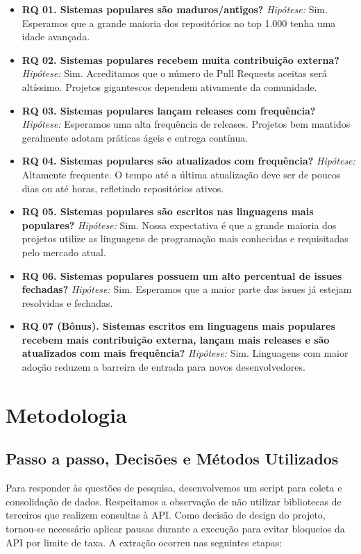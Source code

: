 \documentclass[12pt,a4paper]{article}
\begin{document}
\begin{itemize}
    \item \textbf{RQ 01. Sistemas populares são maduros/antigos?}
    \textit{Hipótese:} Sim. Esperamos que a grande maioria dos repositórios no top 1.000 tenha uma idade avançada.
    
    \item \textbf{RQ 02. Sistemas populares recebem muita contribuição externa?}
    \textit{Hipótese:} Sim. Acreditamos que o número de Pull Requests aceitas será altíssimo. Projetos gigantescos dependem ativamente da comunidade.
    
    \item \textbf{RQ 03. Sistemas populares lançam releases com frequência?}
    \textit{Hipótese:} Esperamos uma alta frequência de releases. Projetos bem mantidos geralmente adotam práticas ágeis e entrega contínua.
    
    \item \textbf{RQ 04. Sistemas populares são atualizados com frequência?}
    \textit{Hipótese:} Altamente frequente. O tempo até a última atualização deve ser de poucos dias ou até horas, refletindo repositórios ativos.
    
    \item \textbf{RQ 05. Sistemas populares são escritos nas linguagens mais populares?}
    \textit{Hipótese:} Sim. Nossa expectativa é que a grande maioria dos projetos utilize as linguagens de programação mais conhecidas e requisitadas pelo mercado atual.
    
    \item \textbf{RQ 06. Sistemas populares possuem um alto percentual de issues fechadas?}
    \textit{Hipótese:} Sim. Esperamos que a maior parte das issues já estejam resolvidas e fechadas.
    
    \item \textbf{RQ 07 (Bônus). Sistemas escritos em linguagens mais populares recebem mais contribuição externa, lançam mais releases e são atualizados com mais frequência?}
    \textit{Hipótese:} Sim. Linguagens com maior adoção reduzem a barreira de entrada para novos desenvolvedores.
\end{itemize}

\section{Metodologia}

\subsection*{Passo a passo, Decisões e Métodos Utilizados}
Para responder às questões de pesquisa, desenvolvemos um script para coleta e consolidação de dados. Respeitamos a observação de não utilizar bibliotecas de terceiros que realizem consultas à API. Como decisão de design do projeto, tornou-se necessário aplicar pausas durante a execução para evitar bloqueios da API por limite de taxa. A extração ocorreu nas seguintes etapas:
\end{document}
